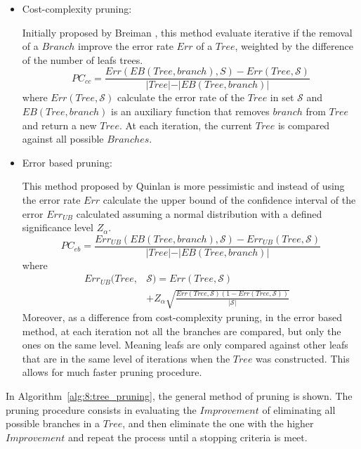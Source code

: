 \begin{itemize}
\item Cost-complexity pruning:
  
Initially proposed by Breiman  \citep{Breiman1984a}, this method evaluate iterative if the removal 
of a $Branch$ improve the error rate $Err$ of a $Tree$, weighted by the difference of the 
number of leafs trees.
\begin{equation}\label{eq:8:pruning}
PC_{cc} = \frac{Err(EB(Tree,branch),S)-Err(Tree,\mathcal{S}) }
{\vert Tree\vert-\vert EB(Tree,branch)\vert}
\end{equation} 
where $Err(Tree,\mathcal{S})$ calculate the error rate of the $Tree$ in set $\mathcal{S}$ and 
$EB(Tree,branch)$ is an auxiliary function that removes $branch$ from $Tree$ and return a new 
$Tree$. At each iteration, the current $Tree$ is compared against all possible $Branches$.
    
\item Error based pruning:
  
This method proposed by Quinlan  \citep{Quinlan1992} is more pessimistic and instead of  using the 
error rate $Err$ calculate the upper bound of the confidence interval   of the error 
$Err_{UB}$ calculated assuming a normal distribution with a defined significance level 
$Z_\alpha$.
\begin{equation}
PC_{eb} = \frac{Err_{UB}(EB(Tree,branch),\mathcal{S})-Err_{UB}(Tree,\mathcal{S}) }
    {\vert Tree\vert-\vert EB(Tree,branch)\vert}
\end{equation} 
where 
\begin{align}
    Err_{UB}(Tree,&\mathcal{S})= Err(Tree,\mathcal{S}) & \nonumber \\
    &+Z_\alpha \sqrt{  
\frac{Err(Tree,\mathcal{S})(1-Err(Tree,\mathcal{S}))}{\vert \mathcal{S} \vert}} &
\end{align}   
Moreover, as a difference from cost-complexity pruning, in the error based method, at each 
iteration not all the branches are compared, but only the ones on the same level. Meaning leafs 
are only compared against other leafs that are in the same level of iterations when the $Tree$ 
was constructed. This allows for much faster pruning procedure.
\end{itemize}

In Algorithm~\ref{alg:8:tree_pruning}, the general method of pruning is shown. The pruning 
procedure consists in evaluating the $Improvement$ of eliminating all possible branches in a 
$Tree$, 
and then eliminate the one with the higher $Improvement$ and repeat the process until a stopping 
criteria is meet.

